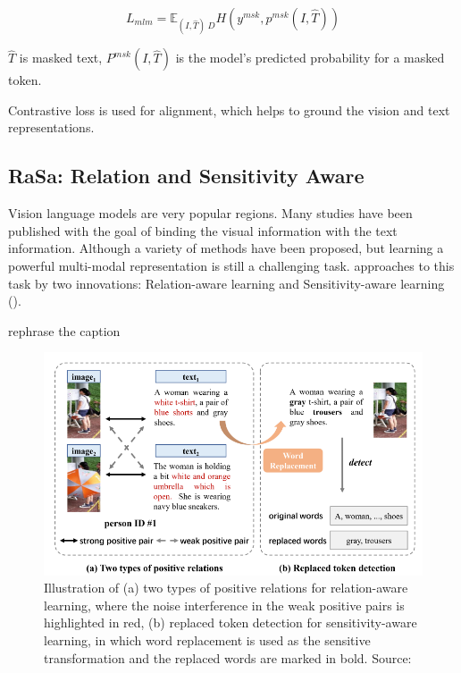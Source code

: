 \begin{displaymath}
    L_{mlm} = \mathbb{E}_{(I,\hat{T})~D}H(y^{msk}, p^{msk}(I,\hat{T}))
\end{displaymath}

$\hat{T}$ is masked text, $P^{msk}(I,\hat{T})$ is the model's predicted probability for a masked token. 

Contrastive loss is used for alignment, which helps to ground the vision and text representations.

\subsection{RaSa: Relation and Sensitivity Aware}

Vision language models are very popular regions. Many studies have been published with the goal of binding the visual information with the text information. Although a variety of methods have been proposed, but learning a powerful multi-modal representation is still a challenging task. \cite{Bai2023RaSaRA} approaches to this task by two innovations: Relation-aware learning and Sensitivity-aware learning (\cite{Bai2023RaSaRA}).

{\color{red}rephrase the caption}
\begin{figure}
    \includegraphics[width=\linewidth]{img/weak_positive_relation.png}
    \caption{Illustration of (a) two types of positive relations for relation-aware learning, where the noise interference in the weak positive pairs is highlighted in red, (b) replaced token detection for sensitivity-aware learning, in which word replacement is used as the sensitive transformation and the replaced words are marked in bold. Source:\cite{Bai2023RaSaRA}}
    \label{img:rasa}
\end{figure}

